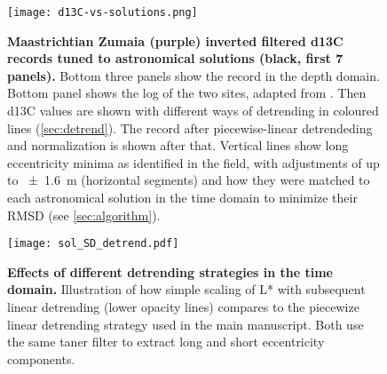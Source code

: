 \documentclass[draft]{agujournal2019}
\newcommand{\ijk}{\textcolor{blue}}
\begin{document}
\begin{figure}
  \centering
  \texttt{[image: d13C-vs-solutions.png]}
  \caption{\label{fig:rolling-age-d13C}
    \textbf{Maastrichtian Zumaia (purple) inverted filtered \gls{d13C} records tuned to astronomical solutions (black, first 7 panels).}
    Bottom three panels show the record in the depth domain.
    Bottom panel shows the log of the two sites, adapted from .
    Then \gls{d13C} values are shown with different ways of detrending in coloured lines (\cref{sec:detrend}).
    The record after piecewise-linear detrendeding and normalization is shown after that.
    Vertical lines show long eccentricity minima as identified in the field,
    with adjustments of up to \qty{\pm1.6}{\metre} (horizontal segments)
    and how they were matched to each astronomical solution in the time domain to minimize their \gls{RMSD} (see \cref{sec:algorithm}).
    }
\end{figure}


\begin{figure}
  \centering \texttt{[image: sol\_SD\_detrend.pdf]}
  \caption{\label{fig:Lstar-detrend}
  \textbf{Effects of different detrending strategies in the time domain.}
    Illustration of how simple scaling of \gls{L*} with subsequent linear detrending (lower opacity lines)
    compares to the piecewize linear detrending strategy used in the main manuscript.
    Both use the same taner filter to extract long and short eccentricity components.
    }
\end{figure}
\end{document}
